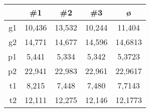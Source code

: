         \begin{center}
            \begin{tabular}{|r|S[table-format=2.3]|S[table-format=2.3]|S[table-format=2.3]|S[table-format=2.4]|}
                \hline
                 & {\#1} & {\#2} & {\#3} & ø \\\hline
                g1 & 10,436 & 13,532 & 10,244 & 11,404  \\\hline
                g2 & 14,771 & 14,677 & 14,596 & 14,6813 \\\hline
                p1 & 5,441  & 5,334  & 5,342  & 5,3723  \\\hline
                p2 & 22,941 & 22,983 & 22,961 & 22,9617 \\\hline
                t1 & 8,215  & 7,448  & 7,480  & 7,7143  \\\hline
                t2 & 12,111 & 12,275 & 12,146 & 12,1773 \\\hline
            \end{tabular}
        \end{center}
